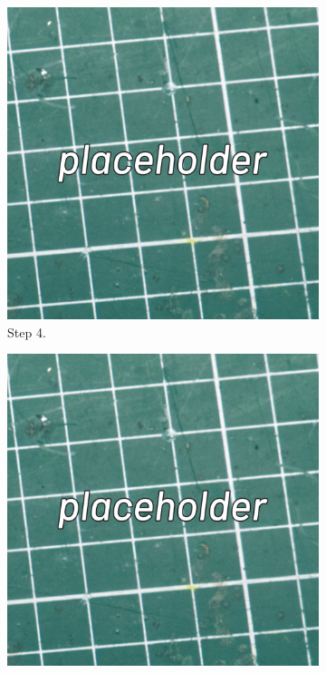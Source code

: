 \documentclass[12pt, a4paper]{article}
\begin{document}
\begin{figure}[H]
    \centering
    \begin{subfigure}{0.3\textwidth}
        \includegraphics[width=\textwidth]{images/placeholder.jpg}
        \caption*{Step 4.}
    \end{subfigure}
    \hspace{2mm}
    \begin{subfigure}{0.3\textwidth}
        \includegraphics[width=\textwidth]{images/placeholder.jpg}

\end{subfigure}
\end{figure}
\end{document}
